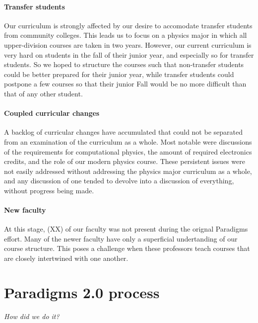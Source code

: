 \documentclass[english,aps,pra,reprint,noshowpacs,superscriptaddress]{revtex4-1}
\begin{document}
\paragraph{Transfer students}
Our curriculum is strongly affected by our desire to accomodate
transfer students from community colleges.  This leads us to focus on
a physics major in which all upper-division courses are taken in two
years.  However, our current curriculum is very hard on students in
the fall of their junior year, and especially so for transfer
students.  So we hoped to structure the courses such that non-transfer
students could be better prepared for their junior year, while
transfer students could postpone a few courses so that their junior
Fall would be no more difficult than that of any other student.

\paragraph{Coupled curricular changes}
A backlog of curricular changes have accumulated that could not be
separated from an examination of the curriculum as a whole.  Most
notable were discussions of the requirements for computational
physics, the amount of required electronics credits, and the role of
our modern physics course.  These persistent issues were not easily
addressed without addressing the physics major curriculum as a whole,
and any discussion of one tended to devolve into a discussion of
everything, without progress being made.

\paragraph{New faculty}
At this stage, (XX) of our faculty was not present during the orignal
Paradigms effort.  Many of the newer faculty have only a superficial
undertanding of our course structure.  This poses a challenge when
these professors teach courses that are closely intertwined with one
another.

\section{Paradigms 2.0 process}
\emph{How did we do it?}

\newcommand\mathcourse[2]{\emph{#1}}
\newcommand\noted[2]{\textbf{#1} (#2)}
\newcommand\paradigm[1]{{\sc #1} (3)}
\newcommand\capstone[1]{#1 (3)}
\newcommand\onecredit[1]{#1 (1)}
\newcommand\threecredit[1]{#1 (3)}
\newcommand\fourcredit[1]{#1 (4)}
\end{document}
